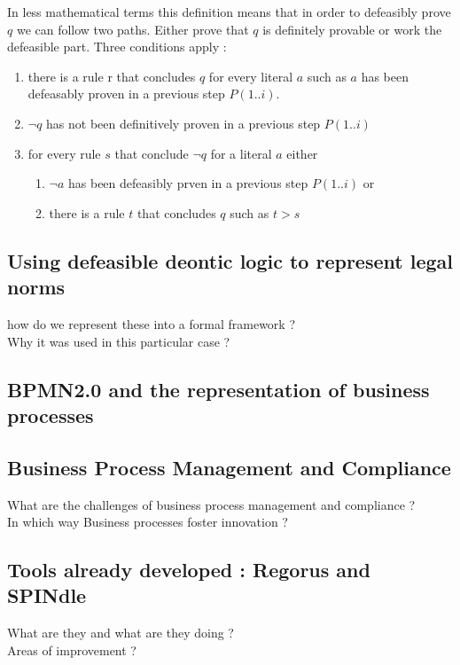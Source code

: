 \documentclass[10pt]{report}
\begin{document}
In less mathematical terms this definition means that in order to defeasibly prove $q$ we can follow two paths. Either prove that $q$ is definitely provable or work the defeasible part. Three conditions apply :
\begin{enumerate}
\item there is a rule r that concludes $q$ for every literal $a$ such as $a$ has been defeasably proven in a previous step $P(1..i)$.
\item $\neg q$ has not been definitively proven in a previous step $P(1..i)$
\item for every rule $s$ that conclude $\neg q$ for a literal $a$ either
  \begin{enumerate}
  \item $\neg a$ has been defeasibly prven in a previous step $P(1..i)$ or
  \item there is a rule $t$ that concludes $q$ such as $t>s$
  \end{enumerate}
\end{enumerate}


\subsection{Using defeasible deontic logic to represent legal norms}




how do we represent these into a formal framework ?
~\\Why it was used in this particular case ?


\subsection{BPMN2.0 and the representation of business processes}

\subsection{Business Process Management and Compliance}
What are the challenges of business process management and compliance ?\\
In which way Business processes foster innovation ?

\subsection{Tools already developed : Regorus and SPINdle}
What are they and what are they doing ?\\
Areas of improvement ?
\end{document}
